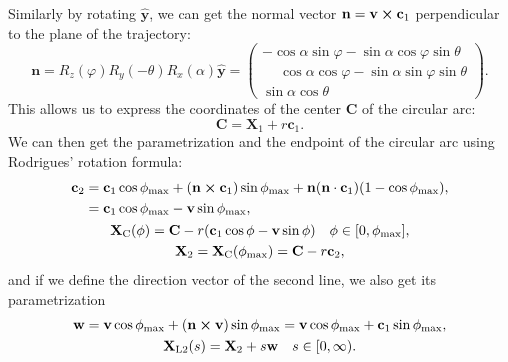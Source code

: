 			Similarly by rotating $\mathbf{\hat{y}}$, we can get the normal vector $\mathbf{n}=\mathbf{v}\cross\mathbf{c}_1$ perpendicular to the plane of the trajectory:
				\begin{equation}
					\mathbf{n} = R_z(\varphi)R_y(-\theta)R_x(\alpha)\mathbf{\hat{y}}=
									\begin{pmatrix}
										-\cos\alpha\sin\varphi-\sin\alpha\cos\varphi\sin\theta\\
										\phantom{-}\cos\alpha\cos\varphi-\sin\alpha\sin\varphi\sin\theta\\
										\sin\alpha\cos\theta
									\end{pmatrix}.
				\end{equation}
			This allows us to express the coordinates of the center $\mathbf{C}$ of the circular arc:
				\begin{equation}
					\mathbf{C} = \mathbf{X}_1+r\mathbf{c}_1.
				\end{equation}
			We can then get the parametrization and the endpoint of the circular arc using Rodrigues' rotation formula:
				\begin{gather}
					\begin{aligned}
						\mathbf{c}_2 &= \mathbf{c}_1\cos\phi_\text{max} + (\mathbf{n}\cross\mathbf{c}_1)\sin\phi_\text{max} + \mathbf{n}(\mathbf{n}\cdot\mathbf{c}_1)(1-\cos\phi_\text{max}),\\
						&= \mathbf{c}_1\cos\phi_\text{max} - \mathbf{v}\sin\phi_\text{max},
					\end{aligned}\\
					\mathbf{X}_\text{C}(\phi) = \mathbf{C} - r(\mathbf{c}_1\cos\phi - \mathbf{v}\sin\phi) \quad \phi\in[0,\phi_\text{max}],\\
					\mathbf{X}_2 = \mathbf{X}_\text{C}(\phi_\text{max}) = \mathbf{C} - r\mathbf{c}_2,
				\end{gather}
			and if we define the direction vector of the second line, we also get its parametrization
				\begin{gather}
					\mathbf{w} = \mathbf{v}\cos\phi_\text{max} + (\mathbf{n}\cross\mathbf{v})\sin\phi_\text{max} = \mathbf{v}\cos\phi_\text{max} + \mathbf{c}_1\sin\phi_\text{max},\\
					\mathbf{X}_\text{L2}(s) = \mathbf{X}_2 + s\mathbf{w} \quad s\in[0,\infty).
				\end{gather}
				
